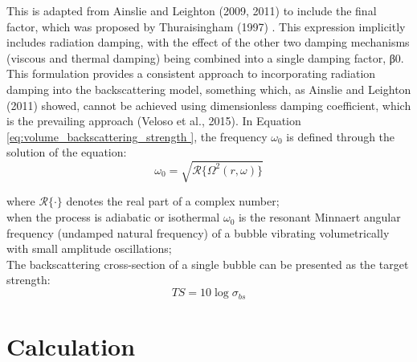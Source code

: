 \documentclass[11pt]{article}
\begin{document}
This is adapted from Ainslie and Leighton (2009, 2011) \cite{ainslie_near_2009, ainslie_review_2011}  to include the final factor, which was proposed by Thuraisingham (1997) \cite{thuraisingham_new_1997}. This expression implicitly includes radiation damping, with the effect of the other two damping mechanisms (viscous and thermal damping) being combined into a single damping factor, β0. This formulation provides a consistent approach to incorporating radiation damping into the backscattering model, something which, as Ainslie and Leighton (2011)\cite{ainslie_review_2011} showed, cannot be achieved using dimensionless damping coefficient, which is the prevailing approach (Veloso et al., 2015)\cite{veloso_new_2015}. In Equation \ref{eq:volume_backscattering_strength }, the frequency $\omega_0$ is defined through the solution of the equation:
\begin{equation}\label{eqn:natural_freq}
\omega_0 = \sqrt{\mathcal{R}\{\Omega^2(r,\omega)\}}
\end{equation}

where  $\mathcal{R}\{·\}$ denotes the real part of a complex number;\\
 when the process is adiabatic or isothermal  $\omega_{0}$ is the resonant Minnaert angular frequency (undamped natural frequency) of a bubble vibrating volumetrically with small amplitude oscillations; \\

	The backscattering cross-section of a single bubble can be presented as the target strength:
\begin{equation}\label{eq:target_strength}
	TS = 10\log{\sigma_{bs}}
 
\end{equation}




\section{Calculation}
\end{document}
